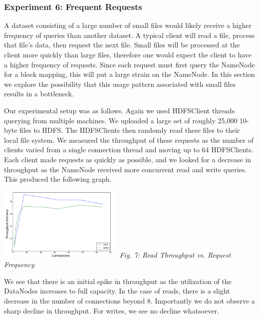 \documentclass[11pt, a4paper]{article}
\begin{document}
\begin{multicols*}{2}
\subsubsection{Experiment 6: Frequent Requests}\label{FrequentRequests}
A dataset consisting of a large number of small files would likely receive a higher frequency of queries than another dataset. A typical client will read a file, process that file's data, then request the next file. Small files will be processed at the client more quickly than large files, therefore one would expect the client to have a higher frequency of requests. Since each request must first query the NameNode for a block mapping, this will put a large strain on the NameNode. In this section we explore the possibility that this usage pattern associated with small files results in a bottleneck.

Our experimental setup was as follows. Again we used HDFSClient threads querying from multiple machines. We uploaded a large set of roughly 25,000 10-byte files to HDFS. The HDFSClients then randomly read these files to their local file system. We measured the throughput of these requests as the number of clients varied from a single connection thread and moving up to 64 HDFSClients. Each client made requests as quickly as possible, and we looked for a decrease in throughput as the NameNode received more concurrent read and write queries. This produced the following graph.
\begin{center}
	\includegraphics[keepaspectratio=true, width=0.45\textwidth]{ConcurrencyResults}	
	\textit{Fig. 7: Read Throughput vs. Request Frequency}
\end{center}
We see that there is an initial spike in throughput as the utilization of the DataNodes increases to full capacity. In the case of reads, there is a slight decrease in the number of connections beyond 8. Importantly we do not observe a sharp decline in throughput. For writes, we see no decline whatsoever.


\end{multicols*}
\end{document}

